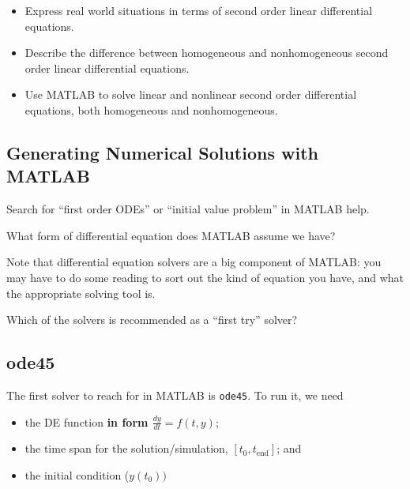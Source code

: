 


\newcommand{\Fe}{ F_{\mbox{ext}} }
\newcommand{\Fg}{ F_{\mbox{grav}} }


\setfont
\pagestyle{fancy}
\renewcommand{\Week}{8 }
\renewcommand{\WeekTitle}{\WeekTitleEight }

\fancyhead[LE,RO]{Week \Week}  %
\fancyfoot{}
\sectionbox{Week \#\Week: \WeekTitle}

\vspace{5mm}
\goals
\begin{itemize}
\item Express real world situations in terms of second order linear
  differential equations.
\item Describe the difference between homogeneous and nonhomogeneous
  second order linear differential equations.
\item Use MATLAB to solve linear and nonlinear second order
  differential equations, both homogeneous and nonhomogeneous.
\end{itemize}
\vspace{5mm}

\newpage

\subsection*{Generating Numerical Solutions with MATLAB}

\problem Search for ``first order ODEs'' or ``initial value problem''
  in MATLAB help.
\vsc 
\vsc 

\problem What form of differential equation does MATLAB assume we have?

\vsc
\vsc


\newpage

Note that differential equation solvers are a big component of MATLAB:
you may have to do some reading to sort out the kind of equation you
have, and what the appropriate solving tool is.

\problem Which of the solvers is recommended as a ``first try''
solver?

\vsc
\vsc

\newpage

\subsection*{ode45}
The first solver to reach for in MATLAB is \verb#ode45#.  To run it, we need
\begin{itemize} 
\item the DE function {\bf in form $\displaystyle \frac{dy}{dt} = f(t, y)$};
\vfill
\item the time span for the solution/simulation, $[t_0, t_{\mbox{end}}]$; and
\vfill
\item the initial condition ($y(t_0))$
\vfill
\end{itemize}

